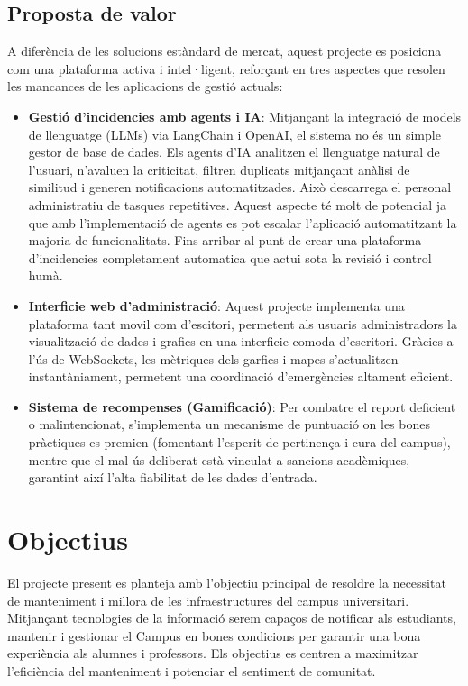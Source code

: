 
\subsection{Proposta de valor}
A diferència de les solucions estàndard de mercat, aquest projecte es posiciona com una plataforma activa i intel·ligent, reforçant en tres aspectes que resolen les mancances de les aplicacions de gestió actuals:

\begin{itemize}
	\item \textbf{Gestió d'incidencies amb agents i IA}: Mitjançant la integració de models de llenguatge (LLMs) via LangChain i OpenAI, el sistema no és un simple gestor de base de dades. Els agents d'IA analitzen el llenguatge natural de l'usuari, n'avaluen la criticitat, filtren duplicats mitjançant anàlisi de similitud i generen notificacions automatitzades. Això descarrega el personal administratiu de tasques repetitives. Aquest aspecte té molt de potencial ja que amb l'implementació de agents es pot escalar l'aplicació automatitzant la majoria de funcionalitats. Fins arribar al punt de crear una plataforma d'incidencies completament automatica que actui sota la revisió i control humà.   
	
	\item \textbf{Interficie web d'administració}: Aquest projecte implementa una plataforma tant movil com d'escitori, permetent als usuaris administradors la visualització de dades i grafics en una interficie comoda d'escritori. Gràcies a l'ús de WebSockets, les mètriques dels garfics i mapes s'actualitzen instantàniament, permetent una coordinació d'emergències altament eficient.
	
	\item \textbf{Sistema de recompenses (Gamificació)}: Per combatre el report deficient o malintencionat, s'implementa un mecanisme de puntuació on les bones pràctiques es premien (fomentant l'esperit de pertinença i cura del campus), mentre que el mal ús deliberat està vinculat a sancions acadèmiques, garantint així l'alta fiabilitat de les dades d'entrada.
	
\end{itemize}

\section{Objectius}
El projecte present es planteja amb l’objectiu principal de resoldre la necessitat de manteniment i millora de les infraestructures del campus universitari. Mitjançant tecnologies de la informació serem capaços de notificar als estudiants, mantenir i gestionar el Campus en bones condicions per garantir una bona experiència als alumnes i professors. Els objectius es centren a maximitzar l'eficiència del manteniment i potenciar el sentiment de comunitat.


